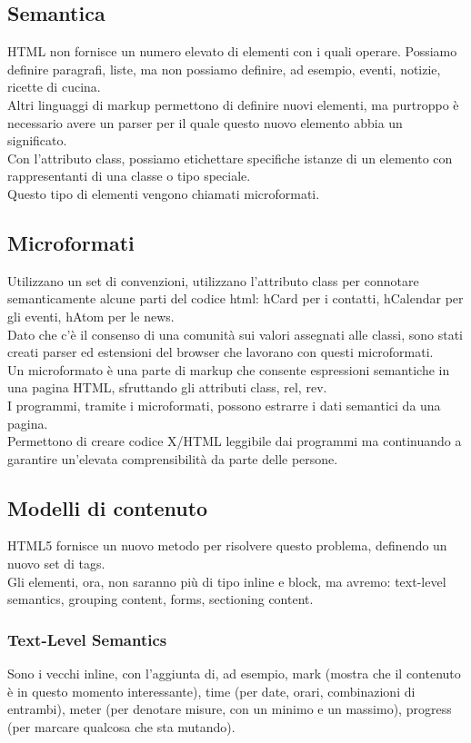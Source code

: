 \documentclass{article}
\begin{document}
\subsection{Semantica}
HTML non fornisce un numero elevato di elementi con i quali operare.
Possiamo definire paragrafi, liste, ma non possiamo definire, ad esempio, eventi, notizie, ricette di cucina.\\
Altri linguaggi di markup permettono di definire nuovi elementi, ma purtroppo è necessario avere un parser per il quale questo nuovo elemento abbia un significato.\\
Con l'attributo class, possiamo etichettare  specifiche istanze di un elemento con rappresentanti di una classe o tipo speciale.\\
Questo tipo di elementi vengono chiamati microformati.
\subsection{Microformati}
Utilizzano un set di convenzioni, utilizzano l'attributo class per connotare semanticamente alcune parti del codice html: hCard per i contatti, hCalendar per gli eventi, hAtom per le news.\\
Dato che c'è il consenso di una comunità sui valori assegnati alle classi, sono stati creati parser ed estensioni del browser che lavorano con questi microformati.\\
Un microformato è una parte di markup che consente espressioni semantiche in una pagina HTML, sfruttando gli attributi class, rel, rev.\\ I programmi, tramite i microformati, possono estrarre i dati semantici da una pagina.\\
Permettono di creare codice X/HTML leggibile dai programmi ma continuando a garantire un'elevata comprensibilità da parte delle persone.\\
\subsection{Modelli di contenuto}
HTML5 fornisce un nuovo metodo per risolvere questo problema, definendo un nuovo set di tags.\\
Gli elementi, ora, non saranno più di tipo inline e block, ma avremo: text-level semantics, grouping content, forms, sectioning content.
\subsubsection{Text-Level Semantics}
Sono i vecchi inline, con l'aggiunta di, ad esempio, mark (mostra che il contenuto è in questo momento interessante), time (per date, orari, combinazioni di entrambi), meter (per denotare misure, con un minimo e un massimo), progress (per marcare qualcosa che sta mutando).
\end{document}
